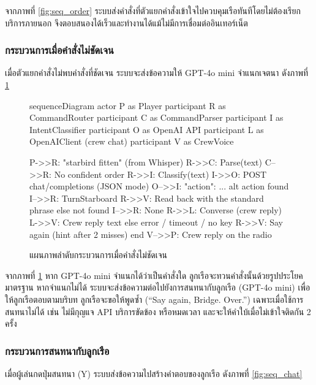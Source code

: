 จากภาพที่ \ref{fig:seq_order} ระบบส่งคำสั่งที่ตัวแยกคำสั่งเข้าใจไปควบคุมเรือทันทีโดยไม่ต้องเรียกบริการภายนอก จึงตอบสนองได้เร็วและทำงานได้แม้ไม่มีการเชื่อมต่ออินเทอร์เน็ต

\subsubsection{กระบวนการเมื่อคำสั่งไม่ชัดเจน}

เมื่อตัวแยกคำสั่งไม่พบคำสั่งที่ชัดเจน ระบบจะส่งข้อความให้ GPT-4o mini จำแนกเจตนา ดังภาพที่ \ref{fig:seq_unclear}

\begin{figure}[!htbp]
\centering
\begin{mermaid}
sequenceDiagram
    actor P as Player
    participant R as CommandRouter
    participant C as CommandParser
    participant I as IntentClassifier
    participant O as OpenAI API
    participant L as OpenAIClient (crew chat)
    participant V as CrewVoice

    P->>R: "starbird fitten" (from Whisper)
    R->>C: Parse(text)
    C-->>R: No confident order
    R->>I: Classify(text)
    I->>O: POST chat/completions (JSON mode)
    O-->>I: {"action": ...}
    alt action found
        I-->>R: TurnStarboard
        R->>V: Read back with the standard phrase
    else not found
        I-->>R: None
        R->>L: Converse (crew reply)
        L->>V: Crew reply text
    else error / timeout / no key
        R->>V: Say again (hint after 2 misses)
    end
    V-->>P: Crew reply on the radio
\end{mermaid}
\caption{แผนภาพลำดับกระบวนการเมื่อคำสั่งไม่ชัดเจน}
\label{fig:seq_unclear}
\end{figure}

จากภาพที่ \ref{fig:seq_unclear} หาก GPT-4o mini จำแนกได้ว่าเป็นคำสั่งใด ลูกเรือจะทวนคำสั่งนั้นด้วยรูปประโยคมาตรฐาน หากจำแนกไม่ได้ ระบบจะส่งข้อความต่อไปยังการสนทนากับลูกเรือ (GPT-4o mini) เพื่อให้ลูกเรือตอบตามบริบท ลูกเรือจะขอให้พูดซ้ำ (``Say again, Bridge. Over.'') เฉพาะเมื่อใช้การสนทนาไม่ได้ เช่น ไม่มีกุญแจ API บริการขัดข้อง หรือหมดเวลา และจะให้คำใบ้เมื่อไม่เข้าใจติดกัน 2 ครั้ง

\subsubsection{กระบวนการสนทนากับลูกเรือ}

เมื่อผู้เล่นกดปุ่มสนทนา (Y) ระบบส่งข้อความไปสร้างคำตอบของลูกเรือ ดังภาพที่ \ref{fig:seq_chat}

